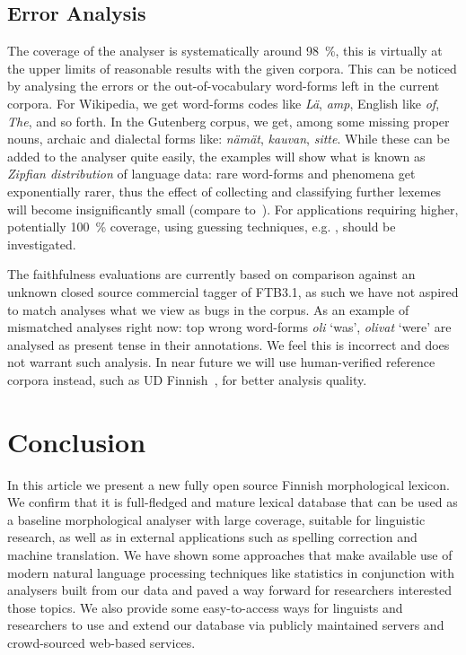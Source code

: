 \documentclass[a4paper,12pt]{article}
\begin{document}
\subsection{Error Analysis}

The coverage of the analyser is systematically around 98~\%, this is
virtually at the upper limits of reasonable results with the given corpora.
This can be noticed by analysing the errors or the out-of-vocabulary
word-forms left in the current corpora. For Wikipedia, we get word-forms codes like
\textit{Lä}, \textit{amp}, English like \textit{of}, \textit{The}, and so forth. In the Gutenberg corpus, we get, among some missing
proper nouns, archaic and dialectal forms like: \textit{nämät}, \textit{kauvan}, \textit{sitte}.
While these can be added to the analyser quite easily,
the  examples will show what is known as \textit{Zipfian distribution} of language data:
rare word-forms and phenomena get exponentially rarer, thus the effect of
collecting and classifying further lexemes will become insignificantly small
(compare to~\cite{manning2011part}). For applications requiring higher, potentially
100~\% coverage, using guessing techniques, e.g. \citet{mikheev1997automatic}, should be
investigated.

The faithfulness evaluations are currently based on
comparison against an unknown closed source
commercial tagger of FTB3.1, as such we have not
aspired to match analyses what we view as bugs in
the corpus. As an example of mismatched analyses
right now: top wrong word-forms \textit{oli} `was',
\textit{olivat} `were' are analysed as present tense
in their annotations. We feel this is incorrect and
does not warrant such analysis. In near future we
will use human-verified reference corpora instead,
such as UD Finnish~\cite{pyysalo2015universal}, for
better analysis quality.


\section{Conclusion}
\label{sec:conclusion}

In this article we present a new fully open source Finnish
morphological lexicon. We confirm that it is full-fledged and mature lexical
database that can be used as a baseline morphological analyser with large
coverage, suitable for linguistic research, as well as in external applications
such as spelling correction and machine translation. We have shown
some approaches that make available use of modern natural language processing
techniques like statistics in conjunction with analysers built from our data
and paved a way forward for researchers interested those topics. We also
provide some easy-to-access ways for linguists and researchers to use and
extend our database via publicly maintained servers and crowd-sourced web-based
services.
\end{document}
